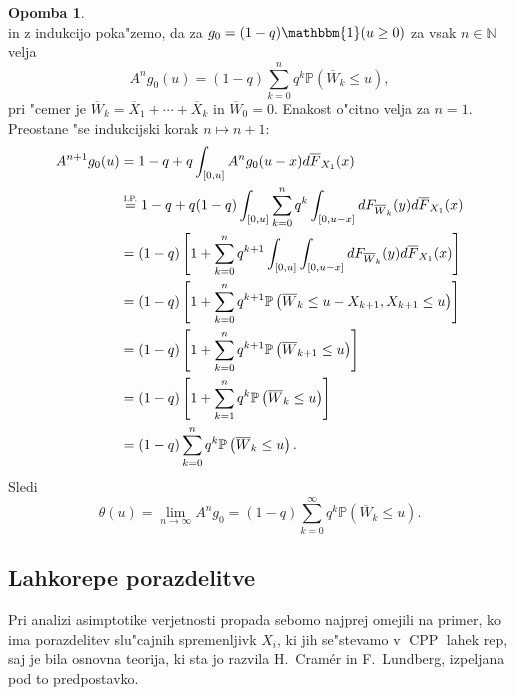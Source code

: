\documentclass[12pt, a4paper, reqno]{amsart}
\theoremstyle{definition}
\newtheorem{opomba}[definicija]{Opomba}
\theoremstyle{plain}
\newcommand{\N}{\mathbb{N}}
\newcommand{\Prob}{\mathbb{P}}
\newcommand{\1}{\mathds{1}}
\DeclareMathOperator{\CPP}{CPP}
\begin{document}
\begin{opomba}
\begin{equation*}
    \end{equation*}
    in z indukcijo poka"zemo, da za $g_0 = (1 - q)\mathbbm{1}(u\geq0)$ za vsak $n\in\N$ velja
    \begin{equation*}
        A^ng_0(u) = (1 - q)\sum_{k = 0}^nq^k\Prob\left(\overline{W}_k \leq u\right),
    \end{equation*}
    pri "cemer je $\overline{W}_k = \overline{X}_1 + \cdots + \overline{X}_k$ in $\overline{W}_0 = 0$.
    Enakost o"citno velja za $n=1$. Preostane "se indukcijski korak $n\mapsto n+1:$
    \begin{align*}
        A^{n+1}g_0(u) 
            &= 1 - q + q\int_{[0, u]}A^ng_0(u - x)d\overline{F}_{X_1}(x) \\
            &\stackrel{\text{\scalebox{0.8}{I.P.}}}{=} 1 - q + q(1 - q)\int_{[0, u]}\sum_{k = 0}^nq^k\int_{[0, u-x]}dF_{\overline{W}_k}(y)d\overline{F}_{X_1}(x) \\
            &=  (1 - q)\left[1 + \sum_{k=0}^nq^{k+1}\int_{[0, u]}\int_{[0, u-x]}dF_{\overline{W}_k}(y)d\overline{F}_{X_1}(x)\right] \\
            &= (1 - q)\left[1 + \sum_{k=0}^nq^{k+1}\Prob\left(\overline{W}_k \leq u - X_{k+1}, X_{k+1}\leq u\right)\right] \\
            &= (1 - q)\left[1 + \sum_{k=0}^nq^{k+1}\Prob\left(\overline{W}_{k+1}\leq u\right)\right] \\
            &= (1 - q)\left[1 + \sum_{k=1}^nq^k\Prob\left(\overline{W}_k\leq u\right)\right] \\
            &= (1 - q)\sum_{k=0}^nq^k\Prob\left(\overline{W}_k\leq u\right).
    \end{align*}
    Sledi 
    \begin{equation}
        \theta(u) = \lim_{n\to\infty} A^ng_0 = (1 - q)\sum_{k = 0}^\infty q^k\Prob\left(\overline{W}_k \leq u\right).
        \label{eq:bodocaGeometrijska}
    \end{equation}
    \label{op:OperatorPrenovitvena}
    \end{opomba}

    
    \subsection{Lahkorepe porazdelitve}
        Pri analizi asimptotike verjetnosti propada se\newline bomo najprej omejili na primer, ko ima 
        porazdelitev slu"cajnih spremenljivk $X_i$, ki jih 
        se"stevamo v $\CPP$ lahek rep, saj je bila osnovna teorija, ki sta jo razvila H.\ Cramér in F.\ Lundberg,
        izpeljana pod to predpostavko.
\end{document}
